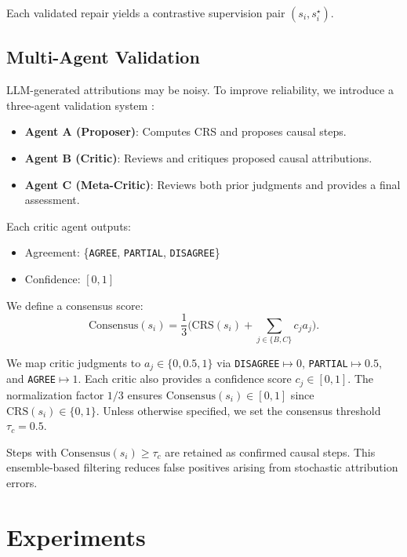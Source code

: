 \documentclass{article}
\theoremstyle{plain}
\theoremstyle{definition}
\theoremstyle{remark}
\begin{document}
Each validated repair yields a contrastive supervision pair $(s_i, s_i^\star)$.

\subsection{Multi-Agent Validation}

LLM-generated attributions may be noisy. To improve reliability, we introduce a three-agent validation system \citep{liang2024mad}:

\begin{itemize}
    \item \textbf{Agent A (Proposer)}: Computes CRS and proposes causal steps.
    \item \textbf{Agent B (Critic)}: Reviews and critiques proposed causal attributions.
    \item \textbf{Agent C (Meta-Critic)}: Reviews both prior judgments and provides a final assessment.
\end{itemize}

Each critic agent outputs:
\begin{itemize}
    \item Agreement: \{\texttt{AGREE}, \texttt{PARTIAL}, \texttt{DISAGREE}\}
    \item Confidence: $[0,1]$
\end{itemize}


We define a consensus score:
\begin{equation}
\mathrm{Consensus}(s_i)
=
\frac{1}{3}
\Big(
\mathrm{CRS}(s_i)
+
\sum_{j \in \{B,C\}} c_j a_j
\Big).
\end{equation}

We map critic judgments to $a_j \in \{0,0.5,1\}$ via \texttt{DISAGREE}$\mapsto 0$, \texttt{PARTIAL}$\mapsto 0.5$, and \texttt{AGREE}$\mapsto 1$. Each critic also provides a confidence score $c_j \in [0,1]$. The normalization factor $1/3$ ensures $\mathrm{Consensus}(s_i)\in[0,1]$ since $\mathrm{CRS}(s_i)\in\{0,1\}$. Unless otherwise specified, we set the consensus threshold $\tau_c=0.5$.


Steps with $\text{Consensus}(s_i) \geq \tau_c$ are retained as confirmed causal steps. This ensemble-based filtering reduces false positives arising from stochastic attribution errors.


\section{Experiments}
\end{document}
